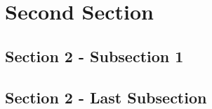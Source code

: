 \documentclass{beamer}
\begin{document}
\section{Second Section}

\subsection{Section 2 - Subsection 1}

%	

\subsection[]{Section 2 - Last Subsection}

\end{document}
